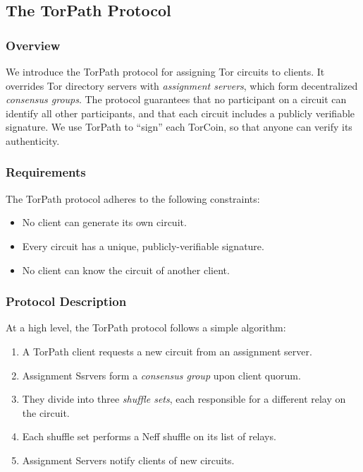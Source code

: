 \subsection{The TorPath Protocol}

\subsubsection{Overview}

We introduce the TorPath protocol for assigning Tor circuits to clients. It overrides Tor directory servers with \textit{assignment servers}, which form decentralized \textit{consensus groups}. The protocol guarantees that no participant on a circuit can identify all other participants, and that each circuit includes a publicly verifiable signature. We use TorPath to ``sign'' each TorCoin, so that anyone can verify its authenticity.

\subsubsection{Requirements}

The TorPath protocol adheres to the following constraints:

\begin{itemize}
  \item No client can generate its own circuit.
  \item Every circuit has a unique, publicly-verifiable signature.
  \item No client can know the circuit of another client.
\end{itemize}

\subsubsection{Protocol Description}
At a high level, the TorPath protocol follows a simple algorithm:

\begin{enumerate}
\item A TorPath client requests a new circuit from an assignment server.
\item Assignment Ssrvers form a \textit{consensus group} upon client quorum.
\item They divide into three \textit{shuffle sets}, each responsible for a different relay on the circuit.
\item Each shuffle set performs a Neff shuffle on its list of relays.
\item Assignment Servers notify clients of new circuits.
\end{enumerate}

